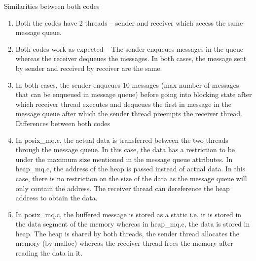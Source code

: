 \documentclass[a4paper,11pt]{article}%
\newenvironment{qanda}{\setlength{\parindent}{0pt}}{\bigskip}
\begin{document}
\begin{qanda}
\begin{enumerate}
\begin{enumerate}
				      Similarities between both codes
				      \begin{enumerate}
					      \item Both the codes have 2 threads – sender and receiver which access the same message queue.
					      \item Both codes work as expected – The sender enqueues messages in the queue whereas the receiver dequeues the messages. In both cases, the message sent by sender and received by receiver are the same.
					      \item  In both cases, the sender enqueues 10 messages (max number of messages that can be enqueued in message queue) before going into blocking state after which receiver thread executes and dequeues the first in message in the message queue after which the sender thread preempts the receiver thread.
					            Differences between both codes
					      \item In posix\_mq.c, the actual data is transferred between the two threads through the message queue. In this case, the data has a restriction to be under the maximum size mentioned in the message queue attributes. In heap\_mq.c, the address of the heap is passed instead of actual data. In this case, there is no restriction on the size of the data as the message queue will only contain the address. The receiver thread can dereference the heap address to obtain the data.
					      \item In posix\_mq.c, the buffered message is stored as a static i.e. it is stored in the data segment of the memory whereas in heap\_mq.c, the data is stored in heap. The heap is shared by both threads, the sender thread allocates the memory (by malloc) whereas the receiver thread frees the memory after reading the data in it.
				      \end{enumerate}


\end{enumerate}
\end{enumerate}
\end{qanda}
\end{document}
